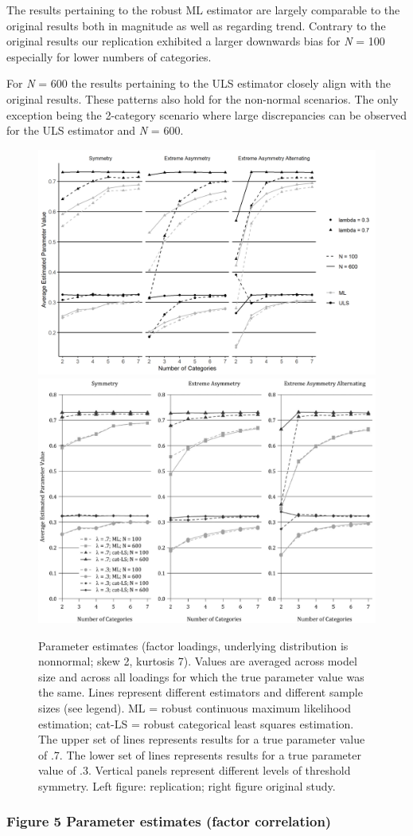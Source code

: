 \documentclass[10,a4paperpaper,]{article}
\begin{document}
The results pertaining to the robust ML estimator are largely comparable
to the original results both in magnitude as well as regarding trend.
Contrary to the original results our replication exhibited a larger
downwards bias for \emph{N} = 100 especially for lower numbers of
categories.

For \emph{N} = 600 the results pertaining to the ULS estimator closely
align with the original results. These patterns also hold for the
non-normal scenarios. The only exception being the 2-category scenario
where large discrepancies can be observed for the ULS estimator and
\emph{N} = 600.

\begin{figure}
\includegraphics[width=0.49\linewidth]{./figures/fig_4} \includegraphics[width=0.49\linewidth]{./figures/fig4_original} \caption{Parameter estimates (factor loadings, underlying distribution is nonnormal; skew 2, kurtosis 7). Values are averaged across model size and across all loadings for which the true parameter value was the same. Lines represent different estimators and different sample sizes (see legend). ML = robust continuous maximum likelihood estimation; cat-LS = robust categorical least squares estimation. The upper set of lines represents results for a true parameter value of .7. The lower set of lines represents results for a true parameter value of .3. Vertical panels represent different levels of threshold symmetry. Left figure: replication; right figure original study.}\label{fig:fig4}
\end{figure}

\subsubsection{Figure 5 Parameter estimates (factor correlation)}
\end{document}
